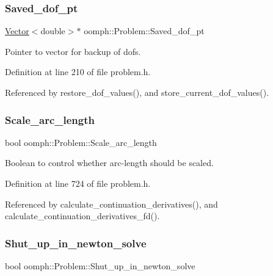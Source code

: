 \subsubsection{\texorpdfstring{Saved\+\_\+dof\+\_\+pt}{Saved\_dof\_pt}}
{\footnotesize\ttfamily \hyperlink{classoomph_1_1Vector}{Vector}$<$double$>$$\ast$ oomph\+::\+Problem\+::\+Saved\+\_\+dof\+\_\+pt\hspace{0.3cm}{\ttfamily [private]}}



Pointer to vector for backup of dofs. 



Definition at line 210 of file problem.\+h.



Referenced by restore\+\_\+dof\+\_\+values(), and store\+\_\+current\+\_\+dof\+\_\+values().

\mbox{\label{classoomph_1_1Problem_a708322baf423e373970384006c2ca4db}} 
\subsubsection{\texorpdfstring{Scale\+\_\+arc\+\_\+length}{Scale\_arc\_length}}
{\footnotesize\ttfamily bool oomph\+::\+Problem\+::\+Scale\+\_\+arc\+\_\+length\hspace{0.3cm}{\ttfamily [protected]}}



Boolean to control whether arc-\/length should be scaled. 



Definition at line 724 of file problem.\+h.



Referenced by calculate\+\_\+continuation\+\_\+derivatives(), and calculate\+\_\+continuation\+\_\+derivatives\+\_\+fd().

\mbox{\label{classoomph_1_1Problem_ab4a3743c23a2d1eed56981484636c958}} 
\subsubsection{\texorpdfstring{Shut\+\_\+up\+\_\+in\+\_\+newton\+\_\+solve}{Shut\_up\_in\_newton\_solve}}
{\footnotesize\ttfamily bool oomph\+::\+Problem\+::\+Shut\+\_\+up\+\_\+in\+\_\+newton\+\_\+solve}



